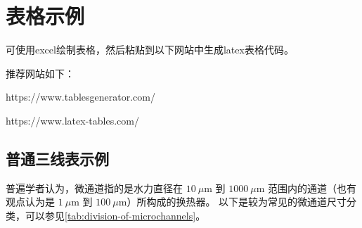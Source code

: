 \chapter{表格示例}\label{ch:2}

可使用excel绘制表格，然后粘贴到以下网站中生成latex表格代码。

推荐网站如下：

https://www.tablesgenerator.com/

https://www.latex-tables.com/

\section{普通三线表示例}
普遍学者认为，微通道指的是水力直径在 $10\ \mu\mathrm{m}$ 到 $1000\ \mu\mathrm{m}$ 范围内的通道（也有观点认为是 $1\ \mu\mathrm{m}$ 到 $100\ \mu\mathrm{m}$）所构成的换热器。
以下是较为常见的微通道尺寸分类，可以参见\cref{tab:division-of-microchannels}。
\begin{table}[htbp]
    \caption[微通道的划分]{微通道的划分\cite{LuSiHong_2021}}
    \label{tab:division-of-microchannels}
\end{table}



